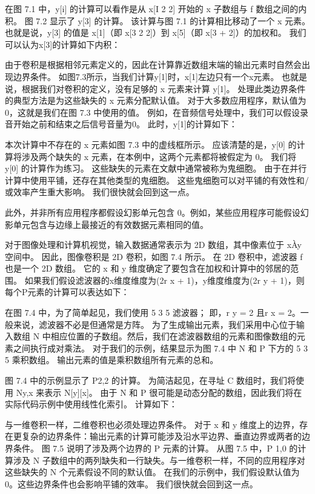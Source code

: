 在图 7.1 中，y[i] 的计算可以看作是从 x[I 2 2] 开始的 x 子数组与 f 数组之间的内积。 图 7.2 显示了 y[3] 的计算。 该计算与图 7.1 的计算相比移动了一个 x 元素。 也就是说，y[3] 的值是 x[1]（即 x[3 2 2]）到 x[5]（即 x[3 + 2]）的加权和。 我们可以认为x[3]的计算如下内积：

由于卷积是根据相邻元素定义的，因此在计算靠近数组末端的输出元素时自然会出现边界条件。 如图7.3所示，当我们计算y[1]时，x[1]左边只有一个x元素。 也就是说，根据我们对卷积的定义，没有足够的 x 元素来计算 y[1]。 处理此类边界条件的典型方法是为这些缺失的 x 元素分配默认值。 对于大多数应用程序，默认值为 0，这就是我们在图 7.3 中使用的值。 例如，在音频信号处理中，我们可以假设录音开始之前和结束之后信号音量为0。 此时，y[1]的计算如下：

本次计算中不存在的 x 元素如图 7.3 中的虚线框所示。 应该清楚的是，y[0] 的计算将涉及两个缺失的 x 元素，在本例中，这两个元素都将被假定为 0。 我们将 y[0] 的计算作为练习。 这些缺失的元素在文献中通常被称为鬼细胞。 由于在并行计算中使用平铺，还存在其他类型的鬼细胞。 这些鬼细胞可以对平铺的有效性和/或效率产生重大影响。 我们很快就会回到这一点。

此外，并非所有应用程序都假设幻影单元包含 0。例如，某些应用程序可能假设幻影单元包含与边缘上最接近的有效数据元素相同的值。

对于图像处理和计算机视觉，输入数据通常表示为 2D 数组，其中像素位于 xÀy 空间中。 因此，图像卷积是 2D 卷积，如图 7.4 所示。 在 2D 卷积中，滤波器 f 也是一个 2D 数组。 它的 x 和 y 维度确定了要包含在加权和计算中的邻居的范围。 如果我们假设滤波器的x维度维度为(2r x + 1)，y维度维度为(2r y + 1)，则每个P元素的计算可以表达如下：

在图 7.4 中，为了简单起见，我们使用 5 3 5 滤波器； 即，r y = 2 且r x = 2。一般来说，滤波器不必是但通常是方阵。 为了生成输出元素，我们采用中心位于输入数组 N 中相应位置的子数组。然后，我们在滤波器数组的元素和图像数组的元素之间执行成对乘法。 对于我们的示例，结果显示为图 7.4 中 N 和 P 下方的 5 3 5 乘积数组。 输出元素的值是乘积数组所有元素的总和。

图 7.4 中的示例显示了 P2,2 的计算。 为简洁起见，在寻址 C 数组时，我们将使用 Ny,x 来表示 N[y][x]。 由于 N 和 P 很可能是动态分配的数组，因此我们将在实际代码示例中使用线性化索引。 计算如下：

与一维卷积一样，二维卷积也必须处理边界条件。 对于 x 和 y 维度上的边界，存在更复杂的边界条件：输出元素的计算可能涉及沿水平边界、垂直边界或两者的边界条件。 图 7.5 说明了涉及两个边界的 P 元素的计算。 从图 7.5 中，P 1,0 的计算涉及 N 子数组中的两列缺失和一行缺失。与一维卷积一样，不同的应用程序对这些缺失的 N 个元素假设不同的默认值。 在我们的示例中，我们假设默认值为 0。这些边界条件也会影响平铺的效率。 我们很快就会回到这一点。

